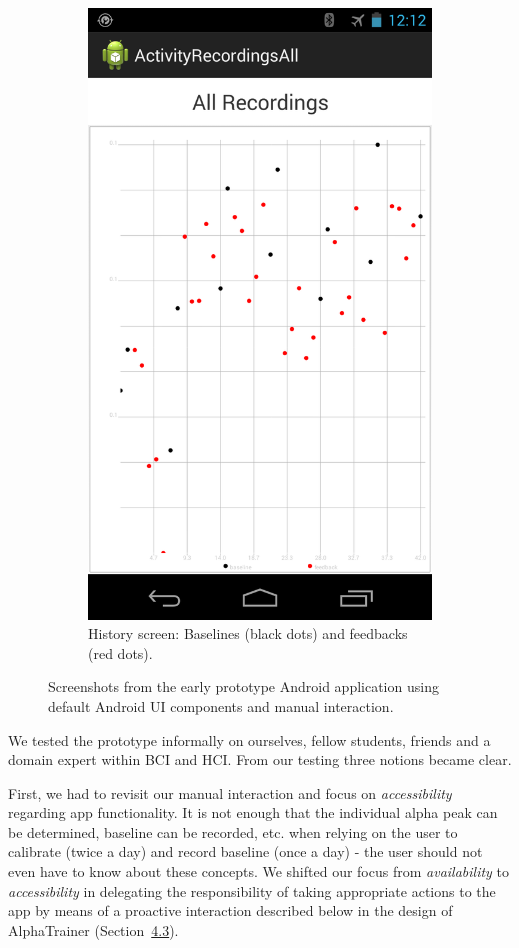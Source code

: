 \documentclass[a4paper,10pt,english,lof,lot,twoside]{puthesis}
\begin{document}
\begin{figure}
\begin{subfigure}[t]{0.30\linewidth}
\includegraphics[width=0.800\linewidth]{early-prototype-screen-history.png}
\caption[History screen]{History screen: Baselines (black dots) and feedbacks (red dots).}\label{ch-design/index:fig-early-prototype-screen-history}\end{subfigure}
\caption[Screen shoots from early Android prototype]{Screenshots from the early prototype Android application using default Android UI components and manual interaction.}\label{ch-design/index:fig-early-prototype}

\end{figure}


We tested the prototype informally on ourselves, fellow students, friends and a
domain expert within BCI and HCI. From our testing three notions became clear.

First, we had to revisit our manual interaction and focus on \emph{accessibility}
regarding app functionality. It is not enough that the individual alpha peak can
be determined, baseline can be recorded, etc. when relying on the user to
calibrate (twice a day) and record baseline (once a day) - the user should not
even have to know about these concepts. We shifted our focus from \emph{availability}
to \emph{accessibility} in delegating the responsibility of taking appropriate
actions to the app by means of a proactive interaction described below in the
design of AlphaTrainer (Section {\hyperref[ch-design/index:ch-design-alphatrainer]{4.3}}).
\end{document}
